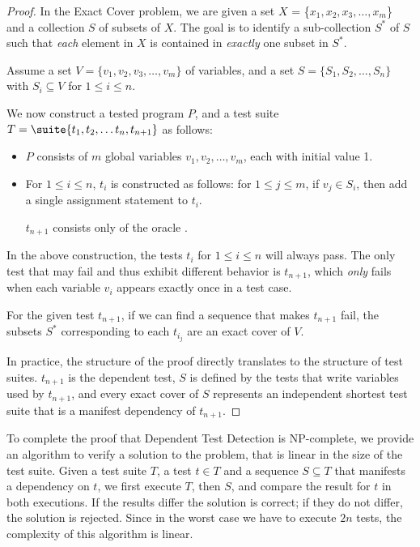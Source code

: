 

\begin{proof}
In the Exact Cover problem,
we are given a set $X$ = \{$x_1, x_2, x_3, \dots, x_m$\} and a collection $S$ of subsets of $X$.
The goal is to identify a sub-collection $S^*$ of $S$ such that \textit{each}
element in $X$ is contained in \textit{exactly} one subset in $S^*$.  

Assume a set $V = \{v_1, v_2, v_3, \dots, v_m\}$ of variables,
and a set $S = \{S_1, S_2, \dots, S_n\}$ with $S_i \subseteq V$ for $ 1\leq i
\leq n$. 

We now construct a tested program $P$, and a test suite
$T = \suite{t_1, t_2, \dots t_n , t_{n+1}}$ as follows:

\begin{itemize}

\item $P$ consists of $m$ global variables 
$v_1, v_2,\dots, v_m$, each with initial value 1.

\item 
For $1 \le i \le n$, $t_i$ is constructed as follows:
for $1 \le j \le m$, if $v_j \in S_i$, then add a
single assignment statement  to $t_i$.

$t_{n+1}$ consists only of the oracle
.

\end{itemize}

In the above construction, the tests $t_i$ for $1 \le i \le n$ 
will always pass. The only
test that may fail and thus exhibit different behavior is $t_{n+1}$, which 
\emph{only} fails when each variable $v_i$ appears exactly
once in a test case.

For the given test $t_{n+1}$, if we can
find a sequence 
that makes $t_{n+1}$ fail, the subsets $S^*$ corresponding
to each $t_{i_j}$ are an exact cover of $V$.

In practice, the structure of the proof directly translates to the
structure of test suites. $t_{n+1}$ is the dependent test, $S$ is
defined by the tests that write variables used by $t_{n+1}$, and every
exact cover of $S$ represents an independent shortest test suite that
is a manifest dependency of $t_{n+1}$.
\end{proof}

To complete the proof that Dependent Test Detection is NP-complete, we
provide an algorithm to verify a solution to the problem, that is
linear in the size of the test suite.
Given a test suite $T$, a test $t \in T$ and a sequence
$S \subseteq T$ that manifests a dependency on $t$, we first execute $T$, then $S$, and
compare the result for $t$ in both executions. 
If the results differ the solution is correct; if they do not differ,
the solution is rejected.
Since in the worst case we have to execute $2n$ tests, the complexity
of this algorithm is linear. 
